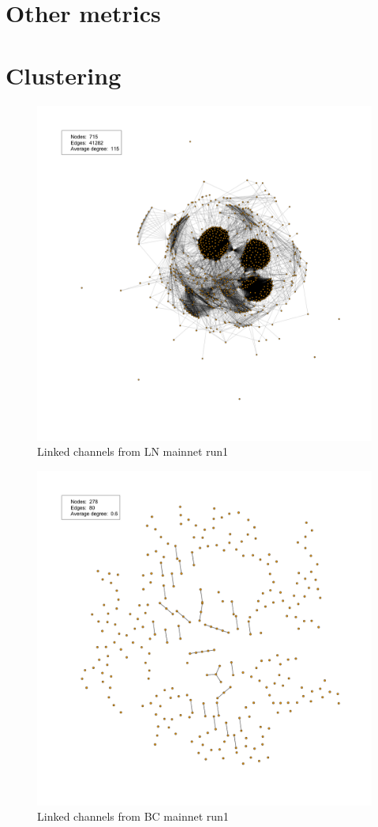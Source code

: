 \section{Other metrics}


\section{Clustering}

\begin{figure}[h]
    \centering
    \includegraphics[width=14cm]{figures/graphs/cg_ln_mainnet_run1.png}
    \caption{Linked channels from LN mainnet run1}
    \label{fig:channelGraphLNTS}
\end{figure}

\begin{figure}[h]
    \centering
    \includegraphics[width=14cm]{figures/graphs/cg_bc_mainnet_run1.png}
    \caption{Linked channels from BC mainnet run1}
    \label{fig:channelGraphLNTS}
\end{figure}